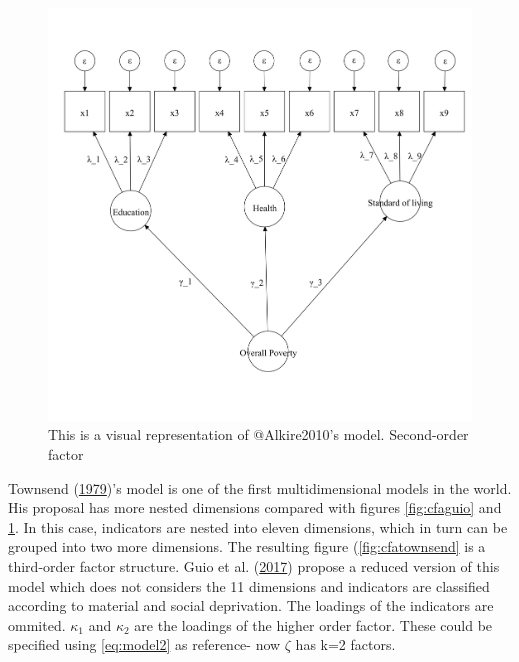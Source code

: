 \documentclass[]{book}
\begin{document}
\begin{figure}[H]

{\centering \includegraphics[width=\textwidth]{Diagram_CFA_mpi} 

}

\caption{This is a visual representation of @Alkire2010's model. Second-order factor}\label{fig:cfampi}
\end{figure}

Townsend (\protect\hyperlink{ref-Townsend1979}{1979})'s model is one of the first multidimensional models in the world. His proposal has more nested dimensions compared with figures \ref{fig:cfaguio} and \ref{fig:cfampi}. In this case, indicators are nested into eleven dimensions, which in turn can be grouped into two more dimensions. The resulting figure (\ref{fig:cfatownsend} is a third-order factor structure. Guio et al. (\protect\hyperlink{ref-Guio2017}{2017}) propose a reduced version of this model which does not considers the 11 dimensions and indicators are classified according to material and social deprivation. The loadings of the indicators are ommited. \(\kappa_1\) and \(\kappa_2\) are the loadings of the higher order factor. These could be specified using \eqref{eq:model2} as reference- now \(\zeta\) has k=2 factors.
\end{document}
